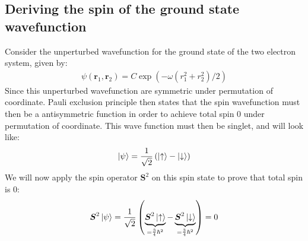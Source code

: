 \documentclass[a4paper, 10pt]{article}
\begin{document}
\begin{appendices}
\section{Deriving the spin of the ground state wavefunction}
Consider the unperturbed wavefunction for the ground state of the
two electron system, given by:
\begin{align}
\psi(\boldsymbol{r}_{1},\boldsymbol{r}_{2}) =
C\exp\left(-\omega\left(r_{1}^{2} + r_{2}^{2}\right)/2\right)
\end{align}
Since this unperturbed wavefunction are symmetric under permutation of coordinate.
Pauli exclusion principle then states that the spin wavefunction must then be
a antisymmetric function in order to achieve
total spin $0$ under permutation of coordinate.
This wave function must then be singlet, and will look like:
\begin{align}
\ket{\psi} = \frac{1}{\sqrt{2}}\left(\ket{\uparrow} - \ket{\downarrow}\right)
\end{align}
We will now apply the spin operator $\boldsymbol{S}^{2}$ on this spin state to prove that
total spin is $0$:
\begin{align}
\boldsymbol{S}^{2}\ket{\psi} = \frac{1}{\sqrt{2}}\left(
\underbrace{\boldsymbol{S}^{2}\ket{\uparrow}}_{= \frac{3}{4}\hbar^{2}} -
\underbrace{\boldsymbol{S}^{2}\ket{\downarrow}}_{= \frac{3}{4}\hbar^{2}}\right)
= 0
\end{align}
	\end{appendices}
\end{document}
